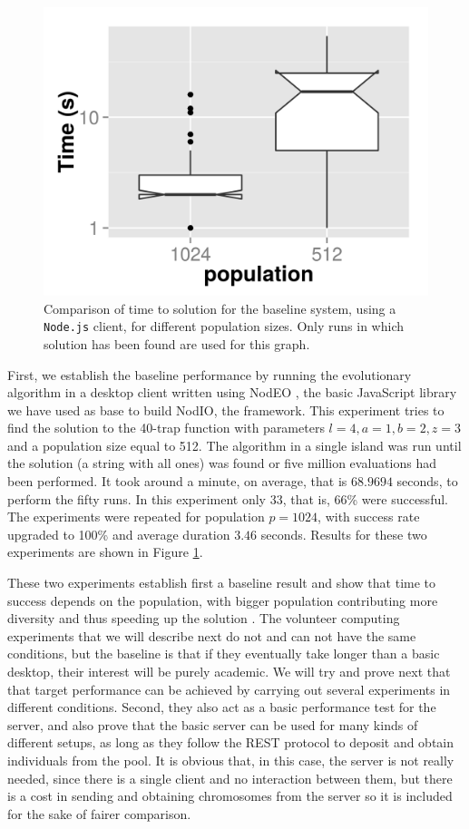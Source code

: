 \documentclass[journal,onecolumn]{IEEEtran}
\begin{document}
\begin{figure}[!t]
\centering
\includegraphics[width=12cm]{baseline-times.png}
\caption{Comparison of time to solution for the baseline system, using a {\tt
    Node.js} client, for different population sizes. Only
runs in which solution has been found are used for this graph.}
\label{fig:baseline}
\end{figure}
First, we establish the baseline performance by running the
evolutionary algorithm in a desktop client written using NodEO
\cite{nodeo2014}, the basic JavaScript library we have used as base to
build {\sf NodIO}, the framework. This experiment tries to 
find the solution to the 40-trap function with parameters $l=4, a=1,
b=2, z=3$ and a population size equal to 512. The algorithm in a
single island was run until the solution (a string with all
ones) was found or five million evaluations had been performed. It
took around a minute, on average, that is $68.9694$ seconds, to
perform the fifty runs. In this experiment only 33, that is, 66\% were
successful. The experiments were repeated for population $p=1024$,
with success rate upgraded to 100\% and average duration $3.46$
seconds. Results for these two experiments
are shown in Figure \ref{fig:baseline}. 

These two experiments establish first a baseline result and show that
time to success depends on the population, with bigger population
contributing more diversity and thus speeding up the solution \cite{DBLP:conf/lion/LaredoDFGB13}. The volunteer computing
experiments that we will describe next do not and can not have the
same conditions, but  
the baseline is that if they eventually take longer than a basic
desktop, their interest will be purely academic. We will try and
prove next that that target performance can be achieved by carrying
out several experiments in different conditions. Second, they also act
as a basic performance test for the server, and also prove that the
basic server can be used for many kinds of different setups, as long
as they follow the REST protocol to deposit and obtain individuals
from the pool. It is obvious that, in this case, the server is not
really needed, since there is a single client and no interaction
between them, but there is a cost in sending and obtaining chromosomes
from the server so it is included for the sake of fairer comparison.
\end{document}

